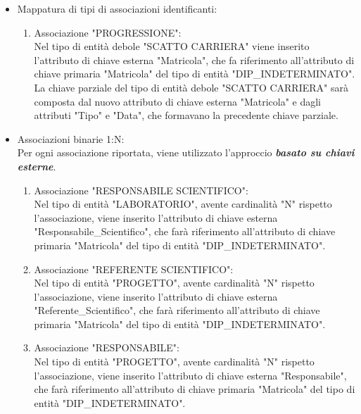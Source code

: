     \begin{itemize}
        \item Mappatura di tipi di associazioni identificanti:
        
        \begin{enumerate}
            \item Associazione "PROGRESSIONE":\\
                Nel tipo di entità debole "SCATTO CARRIERA" viene inserito l'attributo di chiave esterna "Matricola", che fa riferimento all'attributo di chiave primaria "Matricola" del tipo di entità "DIP\_INDETERMINATO". La chiave parziale del tipo di entità debole "SCATTO CARRIERA" sarà composta dal nuovo attributo di chiave esterna "Matricola" e dagli attributi "Tipo" e "Data", che formavano la precedente chiave parziale.
        \end{enumerate}

        \item Associazioni binarie 1:N:\\
            Per ogni associazione riportata, viene utilizzato l'approccio \textbf{\textit{basato su chiavi esterne}}.
        
        \begin{enumerate}
            \item Associazione "RESPONSABILE SCIENTIFICO":\\
                Nel tipo di entità "LABORATORIO", avente cardinalità "N" rispetto l'associazione, viene inserito l'attributo di chiave esterna "Responsabile\_Scientifico", che farà riferimento all'attributo di chiave primaria "Matricola" del tipo di entità "DIP\_INDETERMINATO".
            
            \item Associazione "REFERENTE SCIENTIFICO":\\
                Nel tipo di entità "PROGETTO", avente cardinalità "N" rispetto l'associazione, viene inserito l'attributo di chiave esterna "Referente\_Scientifico", che farà riferimento all'attributo di chiave primaria "Matricola" del tipo di entità "DIP\_INDETERMINATO".
            
            \item Associazione "RESPONSABILE":\\
                Nel tipo di entità "PROGETTO", avente cardinalità "N" rispetto l'associazione, viene inserito l'attributo di chiave esterna "Responsabile", che farà riferimento all'attributo di chiave primaria "Matricola" del tipo di entità "DIP\_INDETERMINATO".
            

\end{enumerate}
\end{itemize}
